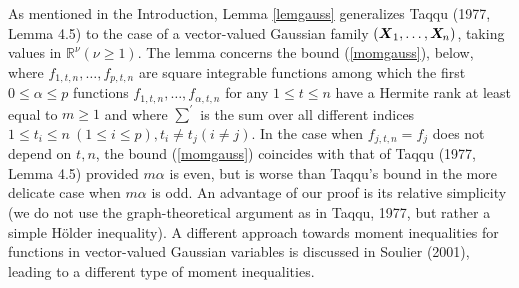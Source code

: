 \documentclass[10pt]{article}
\def\R{\mathbb{R}}
\def\E{\mathrm E}
\newcommand{\mbf}[1]{\mbox{\boldmath $#1$}}
\begin{document}
As mentioned in the Introduction, Lemma \ref{lemgauss} generalizes 
Taqqu (1977, Lemma 4.5) to the case of a vector-valued
Gaussian family $({\mbf X}_1, \dots, {\mbf X}_{\! n}) $, taking
values in $ {\R}^\nu (\nu \ge 1)$. The lemma concerns the bound (\ref{momgauss}), below,  
where $f_{1,t,n}, \dots, f_{p,t,n}$
are square integrable functions among which the first $0\le \alpha
\le p$ functions $f_{1,t,n},\dots, f_{\alpha,t,n} $ for any $1\le
t \le n$ have a Hermite rank at least equal to $m\ge 1$ and where
$\sum\nolimits^\prime $ is the sum over all different indices
$1\le t_i \le n \ (1\le i \le p),  t_i \neq t_j (i\neq j)$. In the
case when $f_{j,t,n} = f_j $ does not depend on $t, n$, the bound (\ref{momgauss}) 
coincides with that of Taqqu (1977, Lemma
4.5) provided $m \alpha $ is even, but  is worse than Taqqu's
bound in the more delicate case when $m \alpha  $ is odd. An advantage of
our proof is its relative simplicity (we do not use the
graph-theoretical argument as in Taqqu, 1977, but rather a simple
H\"older inequality). A different approach towards moment
inequalities for functions in vector-valued Gaussian variables is
discussed in Soulier (2001), leading to a different type of moment inequalities. 


\smallskip
\end{document}
